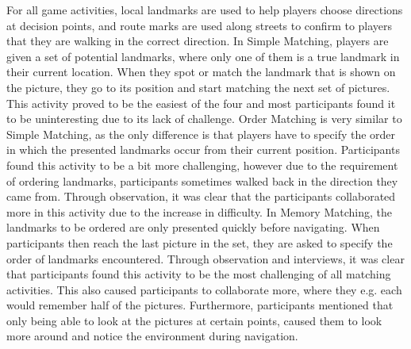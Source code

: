 For all game activities, local landmarks are used to help players choose directions at decision points, and route marks are used along streets to confirm to players that they are walking in the correct direction. In Simple Matching, players are given a set of potential landmarks, where only one of them is a true landmark in their current location. When they spot or match the landmark that is shown on the picture, they go to its position and start matching the next set of pictures. This activity proved to be the easiest of the four and most participants found it to be uninteresting due to its lack of challenge. Order Matching is very similar to Simple Matching, as the only difference is that players have to specify the order in which the presented landmarks occur from their current position. Participants found this activity to be a bit more challenging, however due to the requirement of ordering landmarks, participants sometimes walked back in the direction they came from. Through observation, it was clear that the participants collaborated more in this activity due to the increase in difficulty. In Memory Matching, the landmarks to be ordered are only presented quickly before navigating. When participants then reach the last picture in the set, they are asked to specify the order of landmarks encountered. Through observation and interviews, it was clear that participants found this activity to be the most challenging of all matching activities. This also caused participants to collaborate more, where they e.g. each would remember half of the pictures. Furthermore, participants mentioned that only being able to look at the pictures at certain points, caused them to look more around and notice the environment during navigation.


